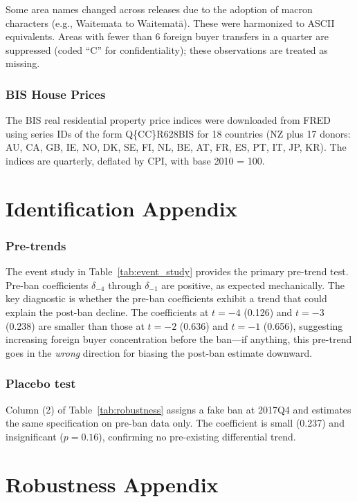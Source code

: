 \documentclass[12pt]{article}
\begin{document}
Some area names changed across releases due to the adoption of macron characters (e.g., Waitemata to Waitemat\=a). These were harmonized to ASCII equivalents. Areas with fewer than 6 foreign buyer transfers in a quarter are suppressed (coded ``C'' for confidentiality); these observations are treated as missing.

\subsubsection*{BIS House Prices} The BIS real residential property price indices were downloaded from FRED using series IDs of the form Q\{CC\}R628BIS for 18 countries (NZ plus 17 donors: AU, CA, GB, IE, NO, DK, SE, FI, NL, BE, AT, FR, ES, PT, IT, JP, KR). The indices are quarterly, deflated by CPI, with base 2010 = 100.

\section{Identification Appendix}

\subsubsection*{Pre-trends} The event study in Table~\ref{tab:event_study} provides the primary pre-trend test. Pre-ban coefficients $\delta_{-4}$ through $\delta_{-1}$ are positive, as expected mechanically. The key diagnostic is whether the pre-ban coefficients exhibit a trend that could explain the post-ban decline. The coefficients at $t = -4$ (0.126) and $t = -3$ (0.238) are smaller than those at $t = -2$ (0.636) and $t = -1$ (0.656), suggesting increasing foreign buyer concentration before the ban---if anything, this pre-trend goes in the \emph{wrong} direction for biasing the post-ban estimate downward.

\subsubsection*{Placebo test} Column (2) of Table~\ref{tab:robustness} assigns a fake ban at 2017Q4 and estimates the same specification on pre-ban data only. The coefficient is small (0.237) and insignificant ($p = 0.16$), confirming no pre-existing differential trend.

\section{Robustness Appendix}
\end{document}
